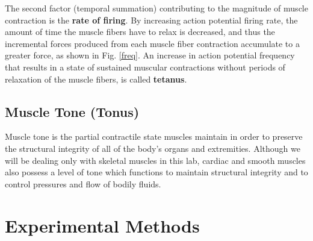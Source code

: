 \documentclass{article}
\begin{document}
The second factor (temporal summation) contributing to the magnitude of muscle contraction is the \textbf{rate of firing}. By increasing action potential firing rate, the amount of time the muscle fibers have to relax is decreased, and thus the incremental forces produced from each muscle fiber contraction accumulate to a greater force, as shown in Fig. \ref{freq}. An increase in action potential frequency that results in a state of sustained muscular contractions without periods of relaxation of the muscle fibers, is called \textbf{tetanus}.

\subsection*{Muscle Tone (Tonus)}
Muscle tone is the partial contractile state muscles maintain in order to preserve the structural integrity of all of the body’s organs and extremities. Although we will be dealing only with skeletal muscles in this lab, cardiac and smooth muscles also possess a level of tone which functions to maintain structural integrity and to control pressures and flow of bodily fluids.

\section*{Experimental Methods}
\end{document}
